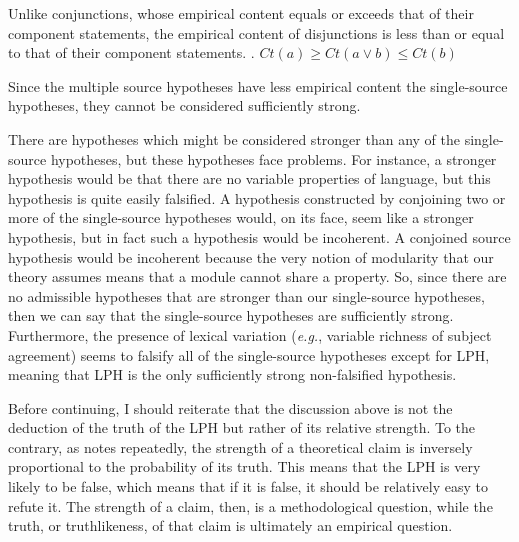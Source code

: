 \documentclass[MilwayThesis]{subfiles}
\begin{document}
Unlike conjunctions, whose empirical content equals or exceeds that of their component statements, the empirical content of disjunctions is less than or equal to that of their component statements.
\ex. $Ct(a) \geq Ct(a\vee b) \leq Ct(b)$

Since the multiple source hypotheses have less empirical content the single-source hypotheses, they cannot be considered sufficiently strong.

There are hypotheses which might be considered stronger than any of the single-source hypotheses, but these hypotheses face problems.
For instance, a stronger hypothesis would be that there are no variable properties of language, but this hypothesis is quite easily falsified.
A hypothesis constructed by conjoining two or more of the single-source hypotheses would, on its face, seem like a stronger hypothesis, but in fact such a hypothesis would be incoherent.
A conjoined source hypothesis would be incoherent because the very notion of modularity that our theory assumes means that a module cannot share a property.
So, since there are no admissible hypotheses that are stronger than our single-source hypotheses, then we can say that the single-source hypotheses are sufficiently strong.
Furthermore, the presence of lexical variation (\textit{e.g.}, variable richness of subject agreement) seems to falsify all of the single-source hypotheses except for LPH, meaning that LPH is the only sufficiently strong non-falsified hypothesis.

Before continuing, I should reiterate that the discussion above is not the deduction of the truth of the LPH but rather of its relative strength.
To the contrary, as \textcite{popper2014conjectures} notes repeatedly, the strength of a theoretical claim is inversely proportional to the probability of its truth.
This means that the LPH is very likely to be false, which means that if it is false, it should be relatively easy to refute it.
The strength of a claim, then, is a methodological question, while the truth, or truthlikeness, of that claim is ultimately an empirical question.
\end{document}
